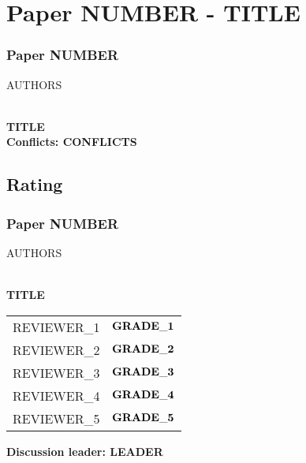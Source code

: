 \section{Paper NUMBER - TITLE}
\frame
{
  \frametitle{Paper NUMBER}
\vspace{-0.25cm}
  {\scriptsize\par AUTHORS}\\[0.5cm]
  {\small \textbf{TITLE}}\\[0.5cm]
  {\small \textbf{\color{Blue}Conflicts: CONFLICTS}} \\
  \vspace{5\baselineskip}
}

\subsection{Rating}

 \frame
 {
   \frametitle{Paper NUMBER}
 \vspace{-0.25cm}
   {\scriptsize\par AUTHORS}\\[0.5cm]
   {\small \textbf{TITLE}}\\[0.5cm]
    \begin{flushright}
    \begin{tabular}{rr}
       \small REVIEWER\_1 & \small $\bf GRADE\_1$ \\
       \small REVIEWER\_2 & \small $\bf GRADE\_2$ \\
       \small REVIEWER\_3 & \small $\bf GRADE\_3$ \\
       \small REVIEWER\_4 & \small $\bf GRADE\_4$ \\
       \small REVIEWER\_5 & \small $\bf GRADE\_5$ \\
    \end{tabular}

    \vspace{-0.25cm}
     {\small \textbf{\color{Blue} Discussion leader: LEADER}} \\

    \end{flushright}

}
